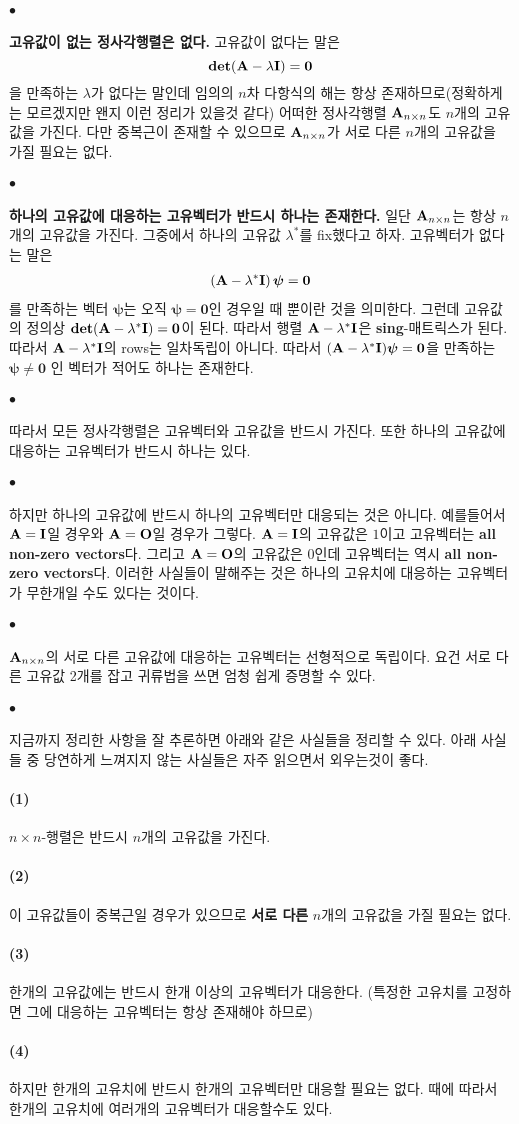 \documentclass[12pt,oneside,english,a4paper]{article}
\def\ck{\paragraph{\Large$\bullet$}\Large}
\def\one{\paragraph{\Large(1)}\Large}
\def\two{\paragraph{\Large(2)}\Large}
\def\three{\paragraph{\Large(3)}\Large}
\def\four{\paragraph{\Large(4)}\Large}
\begin{document}
\ck \textbf{고유값이 없는 정사각행렬은 없다.} 고유값이 없다는 말은 $$\bf{det}({\bf A}-\lambda {\bf I})=0$$을 만족하는 $\lambda$가 없다는 말인데 임의의 $n$차 다항식의 해는 항상 존재하므로(정확하게는 모르겠지만 왠지 이런 정리가 있을것 같다) 어떠한 정사각행렬 ${\bf A}_ {n \times n}$도 $n$개의 고유값을 가진다. 다만 중복근이 존재할 수 있으므로 ${\bf A}_ {n \times n}$가 서로 다른 $n$개의 고유값을 가질 필요는 없다. 

\ck \textbf{하나의 고유값에 대응하는 고유벡터가 반드시 하나는 존재한다.} 일단 ${\bf A}_ {n \times n}$는 항상 $n$개의 고유값을 가진다. 그중에서 하나의 고유값 $\lambda^* $를 fix했다고 하자. 고유벡터가 없다는 말은 
\begin{align*}
\left({\bf A}-\lambda^* {\bf I}\right){\boldsymbol \psi}={\boldsymbol 0}
\end{align*}
를 만족하는 벡터 $\boldsymbol \psi$는 오직 ${\boldsymbol \psi}={\boldsymbol 0}$인 경우일 때 뿐이란 것을 의미한다. 그런데 고유값의 정의상 $\bf{det}({\bf A}-\lambda^* {\bf I})=0$이 된다. 따라서 행렬 ${\bf A}-\lambda^* {\bf I}$은 \textbf{sing}-매트릭스가 된다. 따라서 ${\bf A}-\lambda^* {\bf I}$의 rows는 일차독립이 아니다. 따라서  $({\bf A}-\lambda^* {\bf I}){\boldsymbol \psi}={\boldsymbol 0}$을 만족하는 ${\boldsymbol \psi} \neq {\boldsymbol 0}$ 인 벡터가 적어도 하나는 존재한다. 

\ck 따라서 모든 정사각행렬은 고유벡터와 고유값을 반드시 가진다. 또한 하나의 고유값에 대응하는 고유벡터가 반드시 하나는 있다. 

\ck 하지만 하나의 고유값에 반드시 하나의 고유벡터만 대응되는 것은 아니다. 예를들어서 $\bf A=I$일 경우와 $\bf A=O$일 경우가 그렇다. $\bf A=I$의 고유값은 $1$이고 고유벡터는 \textbf{all non-zero vectors}다. 그리고 $\bf A=O$의 고유값은 $0$인데 고유벡터는 역시 \textbf{all non-zero vectors}다. 이러한 사실들이 말해주는 것은 하나의 고유치에 대응하는 고유벡터가 무한개일 수도 있다는 것이다. 

\ck ${\bf A}_ {n \times n}$의 서로 다른 고유값에 대응하는 고유벡터는 선형적으로 독립이다. 요건 서로 다른 고유값 2개를 잡고 귀류법을 쓰면 엄청 쉽게 증명할 수 있다. 


\ck 지금까지 정리한 사항을 잘 추론하면 아래와 같은 사실들을 정리할 수 있다. 아래 사실들 중 당연하게 느껴지지 않는 사실들은 자주 읽으면서 외우는것이 좋다. 
\one $n \times n$-행렬은 반드시 $n$개의 고유값을 가진다. 
\two 이 고유값들이 중복근일 경우가 있으므로 \textbf{서로 다른} $n$개의 고유값을 가질 필요는 없다. 
\three 한개의 고유값에는 반드시 한개 이상의 고유벡터가 대응한다. (특정한 고유치를 고정하면 그에 대응하는 고유벡터는 항상 존재해야 하므로) 
\four 하지만 한개의 고유치에 반드시 한개의 고유벡터만 대응할 필요는 없다. 때에 따라서 한개의 고유치에 여러개의 고유벡터가 대응할수도 있다. 
\end{document}
